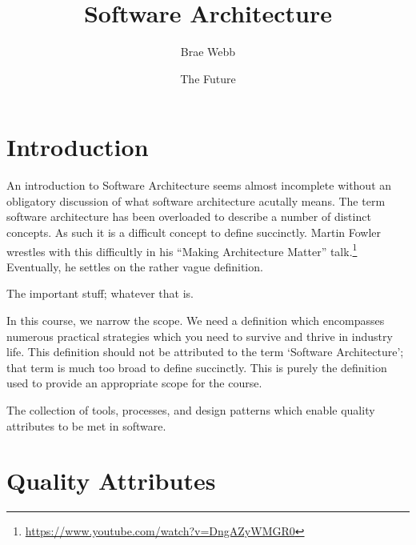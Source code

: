 \documentclass{csse4400}
\title{Software Architecture}
\author{Brae Webb}
\date{{\color{red} The Future}}
\begin{document}
\makecover

\maketitle

\section{Introduction}
An introduction to Software Architecture seems almost incomplete without an obligatory
discussion of what software architecture acutally means.
The term software architecture has been overloaded to describe a number of distinct concepts.
As such it is a difficult concept to define succinctly.
Martin Fowler wrestles with this difficultly in his ``Making Architecture Matter'' talk.\footnote{\url{https://www.youtube.com/watch?v=DngAZyWMGR0}}
Eventually, he settles on the rather vague definition.

\begin{definition}
The important stuff; whatever that is.
\end{definition}

In this course, we narrow the scope.
We need a definition which encompasses numerous practical strategies which you need to survive and thrive in industry life.
This definition should not be attributed to the term `Software Architecture'; that term is much too broad to define succinctly.
This is purely the definition used to provide an appropriate scope for the course.

\begin{definition}
The collection of tools, processes, and design patterns which enable quality attributes to be met in software.
\end{definition}

\section{Quality Attributes}
\end{document}
